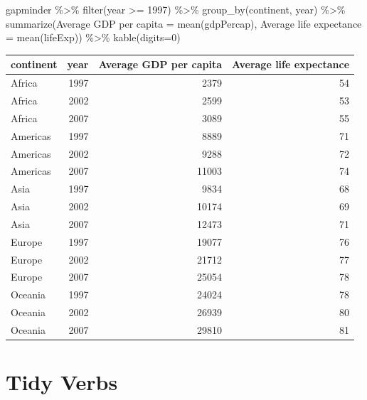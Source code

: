 \documentclass[
]{book}
\makeatletter
\newenvironment{Shaded}{\begin{snugshade}}{\end{snugshade}}
\newcommand{\AttributeTok}[1]{\textcolor[rgb]{0.61,0.61,0.61}{#1}}
\newcommand{\DecValTok}[1]{\textcolor[rgb]{0.06,0.06,0.06}{#1}}
\newcommand{\FunctionTok}[1]{\textcolor[rgb]{0,0,0}{#1}}
\newcommand{\NormalTok}[1]{#1}
\newcommand{\OtherTok}[1]{\textcolor[rgb]{0.37,0.37,0.37}{#1}}
\newcommand{\SpecialCharTok}[1]{\textcolor[rgb]{0,0,0}{#1}}
\newcommand{\StringTok}[1]{\textcolor[rgb]{0.5,0.5,0.5}{#1}}
\newenvironment{kframe}{%
\medskip{}
\setlength{\fboxsep}{.8em}
 \def\at@end@of@kframe{}%
 \ifinner\ifhmode%
  \def\at@end@of@kframe{\end{minipage}}%
  \begin{minipage}{\columnwidth}%
 \fi\fi%
 \def\FrameCommand##1{\hskip\@totalleftmargin \hskip-\fboxsep
 \colorbox{shadecolor}{##1}\hskip-\fboxsep
     \hskip-\linewidth \hskip-\@totalleftmargin \hskip\columnwidth}%
 \MakeFramed {\advance\hsize-\width
   \@totalleftmargin\z@ \linewidth\hsize
   \@setminipage}}%
 {\par\unskip\endMakeFramed%
 \at@end@of@kframe}
\renewenvironment{Shaded}{\begin{kframe}}{\end{kframe}}
\makeatother
\begin{document}
\begin{Shaded}
\begin{Highlighting}[]
\NormalTok{gapminder }\SpecialCharTok{\%\textgreater{}\%} 
  \FunctionTok{filter}\NormalTok{(year }\SpecialCharTok{\textgreater{}=} \DecValTok{1997}\NormalTok{) }\SpecialCharTok{\%\textgreater{}\%} 
  \FunctionTok{group\_by}\NormalTok{(continent, year) }\SpecialCharTok{\%\textgreater{}\%} 
  \FunctionTok{summarize}\NormalTok{(}\StringTok{\textquotesingle{}Average GDP per capita\textquotesingle{}} \OtherTok{=} \FunctionTok{mean}\NormalTok{(gdpPercap), }
            \StringTok{\textquotesingle{}Average life expectance\textquotesingle{}} \OtherTok{=} \FunctionTok{mean}\NormalTok{(lifeExp)) }\SpecialCharTok{\%\textgreater{}\%} 
  \FunctionTok{kable}\NormalTok{(}\AttributeTok{digits=}\DecValTok{0}\NormalTok{)}
\end{Highlighting}
\end{Shaded}

\begin{tabular}{l|r|r|r}
\hline
continent & year & Average GDP per capita & Average life expectance\\
\hline
Africa & 1997 & 2379 & 54\\
\hline
Africa & 2002 & 2599 & 53\\
\hline
Africa & 2007 & 3089 & 55\\
\hline
Americas & 1997 & 8889 & 71\\
\hline
Americas & 2002 & 9288 & 72\\
\hline
Americas & 2007 & 11003 & 74\\
\hline
Asia & 1997 & 9834 & 68\\
\hline
Asia & 2002 & 10174 & 69\\
\hline
Asia & 2007 & 12473 & 71\\
\hline
Europe & 1997 & 19077 & 76\\
\hline
Europe & 2002 & 21712 & 77\\
\hline
Europe & 2007 & 25054 & 78\\
\hline
Oceania & 1997 & 24024 & 78\\
\hline
Oceania & 2002 & 26939 & 80\\
\hline
Oceania & 2007 & 29810 & 81\\
\hline
\end{tabular}

\hypertarget{tidy-verbs}{%
\section{Tidy Verbs}\label{tidy-verbs}}
\end{document}

